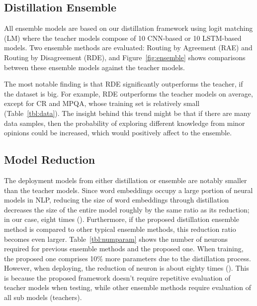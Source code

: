 \documentclass{article}
\begin{document}
\subsection{Distillation Ensemble}
\label{sssec:distillensemble}



All ensemble models are based on our distillation framework using logit matching (LM) where the teacher models compose of 10 CNN-based or 10 LSTM-based models.
Two ensemble methods are evaluated: Routing by Agreement (RAE) and Routing by Disagreement (RDE), and
Figure~\ref{fig:ensemble} shows comparisons between these ensemble models against the teacher models.

The most notable finding is that RDE significantly outperforms the teacher, if the dataset is big.
For example, RDE outperforms the teacher models on average, except for CR and MPQA, whose training set is relatively small (Table~\ref{tbl:data}).
The insight behind this trend might be that if there are many data samples, then the probability of exploring different knowledge from minor opinions could be increased, which would positively affect to the ensemble.








\subsection{Model Reduction}
\label{sssec:modelsize}

The deployment models from either distillation or ensemble are notably smaller than the teacher models.
Since word embeddings occupy a large portion of neural models in NLP, reducing the size of word embeddings through distillation decreases the size of the entire model roughly by the same ratio as its reduction; in our case, eight times ().
Furthermore, if the proposed distillation ensemble method is compared to other typical ensemble methods, 
this reduction ratio becomes even larger.
Table~\ref{tbl:numparam} shows the number of neurons required for previous ensemble methods and the proposed one.
When training, the proposed one comprises 10\% more parameters due to the distillation process.
However, when deploying, the reduction of neuron is about eighty times ().
This is because the proposed framework doesn't require repetitive evaluation of teacher models when testing, while other ensemble methods require evaluation of all sub models (teachers).
\end{document}
